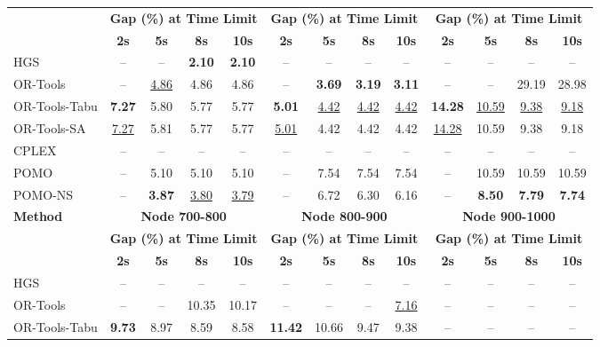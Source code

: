 \documentclass[preprint,12pt,authoryear]{elsarticle}
\theoremstyle{definition}
\begin{document}
\begin{table}[H]
{\begin{tabular}{@{}lcccccccccccc@{}}
\cmidrule(lr){2-5} \cmidrule(lr){6-9} \cmidrule(lr){10-13}
& \multicolumn{4}{c}{\textbf{Gap (\%) at Time Limit}} & \multicolumn{4}{c}{\textbf{Gap (\%) at Time Limit}} & \multicolumn{4}{c}{\textbf{Gap (\%) at Time Limit}} \\
& \textbf{2s} & \textbf{5s} & \textbf{8s} & \textbf{10s} & \textbf{2s} & \textbf{5s} & \textbf{8s} & \textbf{10s} & \textbf{2s} & \textbf{5s} & \textbf{8s} & \textbf{10s} \\
\midrule
HGS & -- & -- & \textbf{2.10} & \textbf{2.10} & -- & -- & -- & -- & -- & -- & -- & -- \\
OR-Tools & -- & \underline{4.86} & 4.86 & 4.86 & -- & \textbf{3.69} & \textbf{3.19} & \textbf{3.11} & -- & -- & 29.19 & 28.98 \\
OR-Tools-Tabu & \textbf{7.27} & 5.80 & 5.77 & 5.77 & \textbf{5.01} & \underline{4.42} & \underline{4.42} & \underline{4.42} & \textbf{14.28} & \underline{10.59} & \underline{9.38} & \underline{9.18} \\
OR-Tools-SA & \underline{7.27} & 5.81 & 5.77 & 5.77 & \underline{5.01} & 4.42 & 4.42 & 4.42 & \underline{14.28} & 10.59 & 9.38 & 9.18 \\
CPLEX & -- & -- & -- & -- & -- & -- & -- & -- & -- & -- & -- & -- \\
POMO & -- & 5.10 & 5.10 & 5.10 & -- & 7.54 & 7.54 & 7.54 & -- & 10.59 & 10.59 & 10.59 \\
POMO-NS & -- & \textbf{3.87} & \underline{3.80} & \underline{3.79} & -- & 6.72 & 6.30 & 6.16 & -- & \textbf{8.50} & \textbf{7.79} & \textbf{7.74} \\
\midrule
\multirow{3}{*}{\textbf{Method}} & \multicolumn{4}{c}{\textbf{Node 700-800}} & \multicolumn{4}{c}{\textbf{Node 800-900}} & \multicolumn{4}{c}{\textbf{Node 900-1000}} \\
\cmidrule(lr){2-5} \cmidrule(lr){6-9} \cmidrule(lr){10-13}
& \multicolumn{4}{c}{\textbf{Gap (\%) at Time Limit}} & \multicolumn{4}{c}{\textbf{Gap (\%) at Time Limit}} & \multicolumn{4}{c}{\textbf{Gap (\%) at Time Limit}} \\
& \textbf{2s} & \textbf{5s} & \textbf{8s} & \textbf{10s} & \textbf{2s} & \textbf{5s} & \textbf{8s} & \textbf{10s} & \textbf{2s} & \textbf{5s} & \textbf{8s} & \textbf{10s} \\
\midrule
HGS & -- & -- & -- & -- & -- & -- & -- & -- & -- & -- & -- & -- \\
OR-Tools & -- & -- & 10.35 & 10.17 & -- & -- & -- & \underline{7.16} & -- & -- & -- & -- \\
OR-Tools-Tabu & \textbf{9.73} & 8.97 & 8.59 & 8.58 & \textbf{11.42} & 10.66 & 9.47 & 9.38 & -- & -- & -- & -- \\

\end{tabular}}
\end{table}
\end{document}
